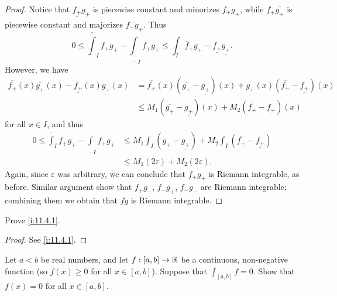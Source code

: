 \begin{proof}
  Notice that \(\underline{f_+} \underline{g_+}\) is piecewise constant and minorizes \(f_+ g_+\), while \(\overline{f_+} \overline{g_+}\) is piecewise constant and majorizes \(f_+ g_+\).
  Thus
  \[
    0 \leq \overline{\int}_I f_+ g_+ - \underline{\int}_I f_+ g_+ \leq \int_I \overline{f}_+ \overline{g_+} - \underline{f_+} \underline{g_+}.
  \]
  However, we have
  \begin{align*}
    \overline{f_+}(x) \overline{g_+}(x) - \underline{f_+}(x) \underline{g_+}(x) & = \overline{f_+}(x) (\overline{g_+} - \underline{g_+})(x) + \underline{g_+}(x) (\overline{f_+} - \underline{f_+})(x) \\
                                                                                & \leq M_1 (\overline{g_+} - \underline{g_+})(x) + M_2 (\overline{f_+} - \underline{f_+})(x)
  \end{align*}
  for all \(x \in I\), and thus
  \begin{align*}
    0 \leq \overline{\int}_I f_+ g_+ - \underline{\int}_I f_+ g_+ & \leq M_1 \int_I (\overline{g_+} - \underline{g_+}) + M_2 \int_I (\overline{f_+} - \underline{f_+}) \\
                                                                  & \leq M_1 (2\varepsilon) + M_2 (2\varepsilon).
  \end{align*}
  Again, since \(\varepsilon\) was arbitrary, we can conclude that \(f_+ g_+\) is Riemann integrable, as before.
  Similar argument show that \(f_+ g_-\), \(f_- g_+\), \(f_- g_-\) are Riemann integrable;
  combining them we obtain that \(fg\) is Riemann integrable.
\end{proof}

\exercisesection

\begin{ex}\label{i:ex:11.4.1}
  Prove \cref{i:11.4.1}.
\end{ex}

\begin{proof}
  See \cref{i:11.4.1}.
\end{proof}

\begin{ex}\label{i:ex:11.4.2}
  Let \(a < b\) be real numbers, and let \(f : [a, b] \to \mathbb{R}\) be a continuous, non-negative function
  (so \(f(x) \geq 0\) for all \(x \in [a, b]\)).
  Suppose that \(\int_{[a, b]} f = 0\).
  Show that \(f(x) = 0\) for all \(x \in [a, b]\).
\end{ex}

